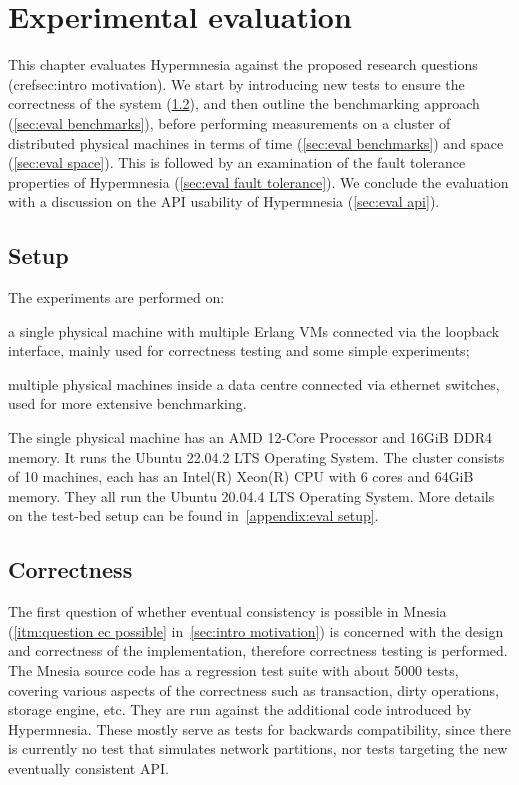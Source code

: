 \section{Experimental evaluation} \label{sec:eval}

This chapter evaluates Hypermnesia against the proposed research questions
(cref{sec:intro motivation}). We start by introducing new tests to ensure
the correctness of the system (\cref{sec:eval correctness}), and then outline
the benchmarking approach (\cref{sec:eval benchmarks}), before performing 
measurements on a cluster of distributed physical machines in terms of
time (\cref{sec:eval benchmarks}) and space (\cref{sec:eval space}).
This is followed by an examination of the fault tolerance properties of Hypermnesia
(\cref{sec:eval fault tolerance}).
We conclude the evaluation with a discussion on the API usability of 
Hypermnesia (\cref{sec:eval api}).

\subsection{Setup}

The experiments are performed on:
\begin{enumerate*}[(a)]
  \item a single physical machine with multiple Erlang VMs connected via the loopback 
  interface, mainly used for correctness testing and some simple experiments;
  \item multiple physical machines inside a data centre connected via ethernet
  switches, used for more extensive benchmarking.
\end{enumerate*}

The single physical machine has an AMD 12-Core Processor and 16GiB DDR4 memory. 
It runs the Ubuntu 22.04.2 LTS Operating System. The cluster consists
of 10 machines, each has an Intel(R) Xeon(R) CPU with 6 cores and 64GiB memory.
They all run the Ubuntu 20.04.4 LTS Operating System. More details on the test-bed
setup can be found in~\cref{appendix:eval setup}.


\subsection{Correctness} \label{sec:eval correctness}

The first question of whether eventual consistency is possible in 
Mnesia (\cref{itm:question ec possible} in~\cref{sec:intro motivation}) is
concerned with the design and correctness of the implementation, therefore
correctness testing is performed.
The Mnesia source code has a regression test suite with about 5000 tests, 
covering various aspects of the correctness such as transaction, 
dirty operations, storage engine, etc. They are
run against the additional code introduced by Hypermnesia. These
mostly serve as tests for backwards compatibility, since there is currently no 
test that simulates network partitions, nor tests targeting the new eventually 
consistent API\@.

